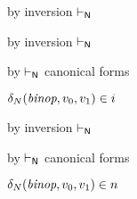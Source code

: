 {\begin{lamportproof*}
    \begin{pfproof}
        \begin{pfproof}
          by inversion $\vdash_{\mathsf{N}}$
        \end{pfproof}
        \begin{pfproof}
            \begin{pfproof}
              by inversion $\vdash_{\mathsf{N}}$
            \end{pfproof}
            \begin{pfproof}
              by $\vdash_{\mathsf{N}}$ canonical forms
            \end{pfproof}
          \qedstep
            \begin{pfproof}
              $\delta_{N}(\textit{binop}, v_0, v_1) \in i$
            \end{pfproof}
        \end{pfproof}
        \begin{pfproof}
            \begin{pfproof}
              by inversion $\vdash_{\mathsf{N}}$
            \end{pfproof}
            \begin{pfproof}
              by $\vdash_{\mathsf{N}}$ canonical forms
            \end{pfproof}
          \qedstep
            \begin{pfproof}
              $\delta_{N}(\textit{binop}, v_0, v_1) \in n$
            \end{pfproof}
        \end{pfproof}
    \end{pfproof}


\end{lamportproof*}}

